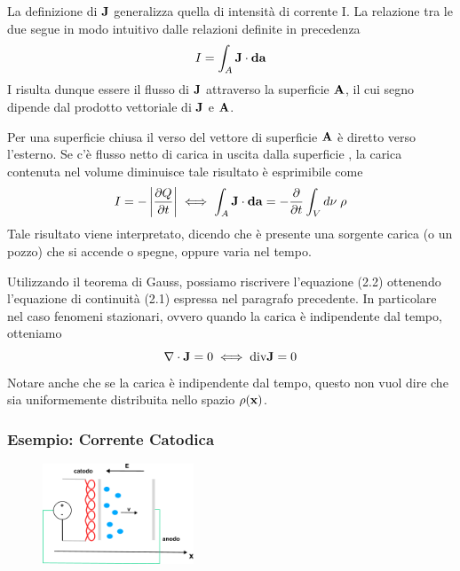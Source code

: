 \noindent La definizione di $\bold{J}$ generalizza quella di intensit\`a di corrente I. La relazione tra le due segue in modo intuitivo dalle relazioni definite in precedenza 
\begin{equation*}
	I = \int_{A} \bold{J} \cdot \bold{da}
\end{equation*}
I risulta dunque essere il flusso di $\bold{J}$ attraverso la superficie $\bold{A}$, il cui segno dipende dal prodotto vettoriale di $\bold{J}$ e $\bold{A}$.

Per una superficie chiusa il verso del vettore di superficie $\bold{A}$  \`e diretto verso l'esterno. Se c'\`e flusso netto di carica in uscita dalla superficie , la carica contenuta nel volume diminuisce tale risultato \`e esprimibile come
\begin{equation}
	I = -\left |\frac{\partial Q}{\partial t } \right| \iff \int_{A}\bold{J} \cdot \bold{da} = - \frac{\partial }{\partial t} \int_{V} d\nu \; \rho
\end{equation}
Tale risultato viene interpretato, dicendo che \`e presente una sorgente carica (o un pozzo) che si accende o spegne, oppure varia nel tempo.

Utilizzando il teorema di Gauss, possiamo riscrivere l'equazione (2.2) ottenendo l'equazione di continuit\`a (2.1) espressa nel paragrafo precedente. In particolare nel caso fenomeni stazionari, ovvero quando la carica \`e indipendente dal tempo, otteniamo 
\begin{equation*}
	\nabla \cdot \bold{J} = 0 \iff \text{div}\bold{J} = 0
\end{equation*}
Notare anche che se la carica \`e indipendente dal tempo, questo non vuol dire che sia uniformemente distribuita nello spazio $\rho(\bold{x})$.

\subsubsection{Esempio: Corrente Catodica}
\begin{figure}  %
    \centering
    \includegraphics[width=0.4\textwidth]{images/cathodic}  %
\end{figure}

